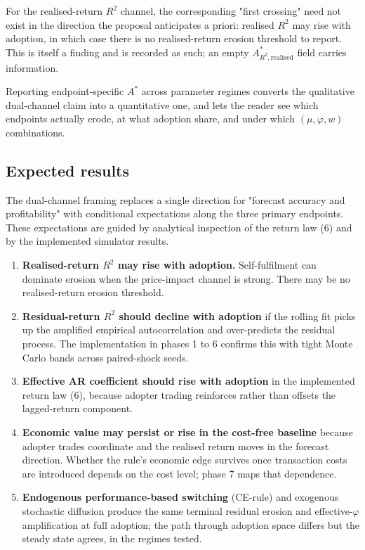 \documentclass[11pt]{article}
\begin{document}
For the realised-return $R^{2}$ channel, the corresponding "first crossing" need not exist in the direction the proposal anticipates a priori: realised $R^{2}$ may rise with adoption, in which case there is no realised-return erosion threshold to report. This is itself a finding and is recorded as such; an empty $A^{*}_{R^{2},\mathrm{realised}}$ field carries information.

Reporting endpoint-specific $A^{*}$ across parameter regimes converts the qualitative dual-channel claim into a quantitative one, and lets the reader see which endpoints actually erode, at what adoption share, and under which $(\mu, \varphi, w)$ combinations.

\subsection{Expected results}

The dual-channel framing replaces a single direction for "forecast accuracy and profitability" with conditional expectations along the three primary endpoints. These expectations are guided by analytical inspection of the return law (6) and by the implemented simulator results.

\begin{enumerate}[itemsep=0.2em]
  \item \textbf{Realised-return $R^{2}$ may rise with adoption.} Self-fulfilment can dominate erosion when the price-impact channel is strong. There may be no realised-return erosion threshold.
  \item \textbf{Residual-return $R^{2}$ should decline with adoption} if the rolling fit picks up the amplified empirical autocorrelation and over-predicts the residual process. The implementation in phases 1 to 6 confirms this with tight Monte Carlo bands across paired-shock seeds.
  \item \textbf{Effective AR coefficient should rise with adoption} in the implemented return law (6), because adopter trading reinforces rather than offsets the lagged-return component.
  \item \textbf{Economic value may persist or rise in the cost-free baseline} because adopter trades coordinate and the realised return moves in the forecast direction. Whether the rule's economic edge survives once transaction costs are introduced depends on the cost level; phase 7 maps that dependence.
  \item \textbf{Endogenous performance-based switching} (CE-rule) and exogenous stochastic diffusion produce the same terminal residual erosion and effective-$\varphi$ amplification at full adoption; the path through adoption space differs but the steady state agrees, in the regimes tested.
\end{enumerate}
\end{document}
